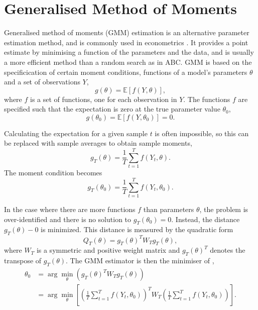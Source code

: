 
\section{Generalised Method of Moments}

Generalised method of moments (GMM) estimation is an alternative parameter estimation method, and is commonly used in econometrics \cite{Hansen1982, Hall1993}. It provides a point estimate by minimising a function of the parameters and the data, and is usually a more efficient method than a random search as in ABC. GMM is based on the specificication of certain moment conditions, functions of a model's parameters $\theta$ and a set of observations $Y$,
%
\begin{equation}
g(\theta) = \mathbb{E}[f(Y, \theta)] ,
\label{eqn:moment}
\end{equation}
%
where $f$ is a set of functions, one for each observation in $Y$. The functions $f$ are specified such that the expectation is zero at the true parameter value $\theta_0$,
%
\begin{equation}
g(\theta_0) = \mathbb{E}[f(Y, \theta_0)] = 0.
\label{eqn:moment}
\end{equation}

Calculating the expectation for a given sample $t$ is often impossible, so this can be replaced with sample averages to obtain sample moments,
%
\begin{equation}
g_T(\theta) = \frac{1}{T} \sum_{t=1}^{T} f(Y_t, \theta) .
\end{equation}
%
The moment condition becomes
%
\begin{equation}
g_T(\theta_0) = \frac{1}{T} \sum_{t=1}^T f(Y_t, \theta_0) .
\end{equation}

In the case where there are more functions $f$ than parameters $\theta$, the problem is over-identified and there is no solution to $g_T(\theta_0) = 0$. Instead, the distance $g_T(\theta) - 0$ is minimized. This distance is measured by the quadratic form
%
\begin{equation}
Q_T(\theta) = g_T(\theta)^T W_T g_T(\theta),
\label{eqn:GMM_distance}
\end{equation}
%
where $W_T$ is a symmetric and positive weight matrix and $g_T(\theta)^T$ denotes the transpose of $g_T(\theta)$. The GMM estimator is then the minimiser of ,
%
\begin{equation}
\begin{split}
\theta_0 &= \arg \min_{\theta}(g_T(\theta)^T W_Tg_T(\theta)) \\
         &= \arg \min_{\theta} \left[ \left( \frac{1}{T}\sum_{t=1}^T f(Y_t, \theta_0) \right)^T W_T \left( \frac{1}{T}\sum_{t=1}^T f(Y_t, \theta_0) \right) \right] .
\end{split}
\label{eqn:GMM}
\end{equation}

